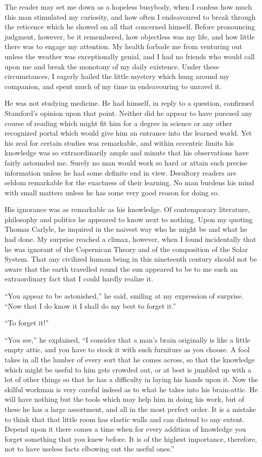 \documentclass[12pt,english,oneside]{book}
\begin{document}
The reader may set me down as a hopeless busybody, when I confess
how much this man stimulated my curiosity, and how often I endeavoured
to break through the reticence which he showed on all that concerned
himself. Before pronouncing judgment, however, be it remembered, how
objectless was my life, and how little there was to engage my attention.
My health forbade me from venturing out unless the weather was exceptionally
genial, and I had no friends who would call upon me and break the
monotony of my daily existence. Under these circumstances, I eagerly
hailed the little mystery which hung around my companion, and spent
much of my time in endeavouring to unravel it.

He was not studying medicine. He had himself, in reply to a question,
confirmed Stamford's opinion upon that point. Neither did he appear
to have pursued any course of reading which might fit him for a degree
in science or any other recognized portal which would give him an
entrance into the learned world. Yet his zeal for certain studies
was remarkable, and within eccentric limits his knowledge was so extraordinarily
ample and minute that his observations have fairly astounded me. Surely
no man would work so hard or attain such precise information unless
he had some definite end in view. Desultory readers are seldom remarkable
for the exactness of their learning. No man burdens his mind with
small matters unless he has some very good reason for doing so.

His ignorance was as remarkable as his knowledge. Of contemporary
literature, philosophy and politics he appeared to know next to nothing.
Upon my quoting Thomas Carlyle, he inquired in the naivest way who
he might be and what he had done. My surprise reached a climax, however,
when I found incidentally that he was ignorant of the Copernican Theory
and of the composition of the Solar System. That any civilized human
being in this nineteenth century should not be aware that the earth
travelled round the sun appeared to be to me such an extraordinary
fact that I could hardly realize it.

{}``You appear to be astonished,'' he said, smiling at my expression
of surprise. {}``Now that I do know it I shall do my best to forget
it.''

{}``To forget it!''

{}``You see,'' he explained, {}``I consider that a man's brain
originally is like a little empty attic, and you have to stock it
with such furniture as you choose. A fool takes in all the lumber
of every sort that he comes across, so that the knowledge which might
be useful to him gets crowded out, or at best is jumbled up with a
lot of other things so that he has a difficulty in laying his hands
upon it. Now the skilful workman is very careful indeed as to what
he takes into his brain-attic. He will have nothing but the tools
which may help him in doing his work, but of these he has a large
assortment, and all in the most perfect order. It is a mistake to
think that that little room has elastic walls and can distend to any
extent. Depend upon it there comes a time when for every addition
of knowledge you forget something that you knew before. It is of the
highest importance, therefore, not to have useless facts elbowing
out the useful ones.''
\end{document}
